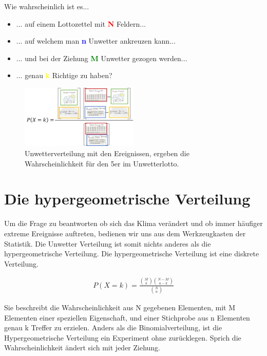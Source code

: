 \begin{refsection}
Wie wahrscheinlich ist es...

\begin{itemize}
\item ... auf einem Lottozettel mit \textcolor{red}{\textbf{N}} Feldern...
\item ... auf welchem man \textcolor{blue}{\textbf{n}} Unwetter ankreuzen kann...
\item ... und bei der Ziehung \textcolor{green}{\textbf{M}} Unwetter gezogen werden...
\item ... genau \textcolor{yellow}{\textbf{k}} Richtige zu haben?
\end{itemize}


\begin{figure}[htbp]
\centering
\includegraphics[width=0.5\textwidth]{extrem/Unwettervert.pdf}
\caption{Unwetterverteilung mit den Ereignissen, ergeben die Wahrscheinlichkeit für den 5er im Unwetterlotto.}
\label{UnwetterVerteilung}
\end{figure}

\section{Die hypergeometrische Verteilung}
Um die Frage zu beantworten ob sich das Klima verändert und ob immer häufiger extreme Ereignisse auftreten, bedienen wir uns aus dem Werkzeugkasten der Statistik. Die Unwetter Verteilung ist somit nichts anderes als die hypergeometrische Verteilung. Die hypergeometrische Verteilung ist eine diskrete Verteilung.

\begin{align*}
P(X = k) = 
\frac{ \binom{M}{k} \binom{N-M}{n-k}}{ \binom{N}{n} }
\end{align*}

Sie beschreibt die Wahrscheinlichkeit aus N gegebenen Elementen, mit M Elementen einer speziellen Eigenschaft, und einer Stichprobe aus n Elementen genau k Treffer zu erzielen. 
Anders als die Binomialverteilung, ist die Hypergeometrische Verteilung ein Experiment ohne zurücklegen. Sprich die Wahrscheinlichkeit ändert sich mit jeder Ziehung.




\end{refsection}
